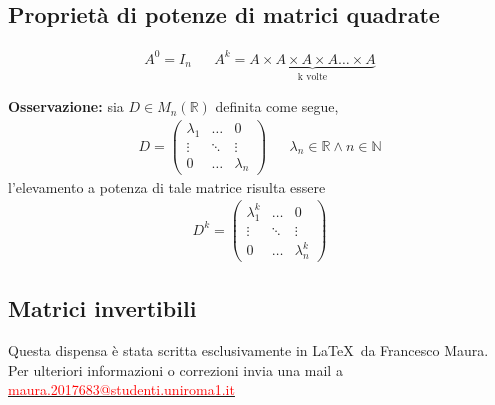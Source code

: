 \documentclass[a4paper]{article}
\newcommand{\n}{\par \noindent \newline}
\newcommand{\ns}{\par \noindent}
\begin{document}
\subsection{Proprietà di potenze di matrici quadrate}
\begin{eqnarray*}
	A^0 = I_n & & A^k = \underset{\text{k volte}}{\underbrace{A\times A \times A \times A \dots \times A}}
\end{eqnarray*}
\n
\textbf{Osservazione: }sia $D \in M_n(\mathbb{R})$ definita come segue,
\begin{eqnarray*}
	D=
	\begin{pmatrix}
		\lambda_1 & \dots & 0 \\
		\vdots & \ddots & \vdots \\
		0 & \dots & \lambda_n
	\end{pmatrix}
	&& \lambda_n \in \mathbb{R} \wedge n \in \mathbb{N}
\end{eqnarray*}
l'elevamento a potenza di tale matrice risulta essere
\begin{eqnarray*}
	D^k=
	\begin{pmatrix}
		\lambda_1^k & \dots & 0 \\
		\vdots & \ddots & \vdots \\
		0 & \dots & \lambda_n^k
	\end{pmatrix}
\end{eqnarray*}
\subsection{Matrici invertibili}


\newpage
\ns
Questa dispensa è stata scritta esclusivamente in \LaTeX \ da Francesco Maura. \\ Per ulteriori informazioni o correzioni invia una mail a \href{mailto:maura.2017683@studenti.uniroma1.it}{\textcolor{red}{maura.2017683@studenti.uniroma1.it}}
\end{document}
